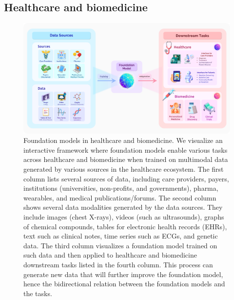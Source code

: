 \newsection
\subsection{Healthcare and biomedicine}
\label{sec:healthcare}


\begin{figure}[!ht]
\centering
\includegraphics[width=\textwidth]{applications/healthcare_figs/Healthcare.png}
\caption{\label{fig:healthcare}
Foundation models in healthcare and biomedicine. 
We visualize an interactive framework where foundation models enable various tasks across healthcare and biomedicine when trained on multimodal data generated by various sources in the healthcare ecosystem. The first column lists several sources of data, including care providers, payers, institutions (universities, non-profits, and governments), pharma, wearables, and medical publications/forums. The second column shows several data modalities generated by the data sources. They include images (\eg chest X-rays), videos (such as ultrasounds), graphs of chemical compounds, tables for electronic health records (EHRs), text such as clinical notes, time series such as ECGs, and genetic data. The third column visualizes a foundation model trained on such data and then applied to healthcare and biomedicine downstream tasks listed in the fourth column. This process can generate new data that will further improve the foundation model, hence the bidirectional relation between the foundation models and the tasks.}
\end{figure}

